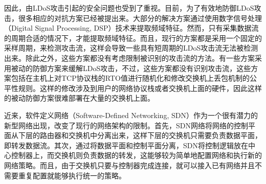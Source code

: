 因此，由LDoS攻击引起的安全问题也受到了重视。目前，为了有效地防御LDoS攻击，很多相应的对抗方案已经被提出来。大部分的解决方案\cite{b1,b4, b6, b7, b22}通过使用数字信号处理（Digital Signal Processing, DSP）技术来提取频域特征。然而，只有采集数据流的周期合适的情况下，才能提取频域特征。而且，现行的方案都是采用一个固定的采样周期，来检测攻击流，这样会导致一些具有短周期的LDoS攻击流无法被检测出来。除此之外，这些方案都没有考虑限制被识别的攻击流的方法。有一些方案采用被动的防御方案来缓解LDoS攻击，不过，这些方案都没有识别攻击流，这些方案包括在主机上对TCP协议栈的RTO值进行随机化\cite{b17}和修改交换机上丢包机制的公平性规则\cite{b8}。这样的修改涉及到用户的网络协议栈或者交换机上面的硬件，因此这样的被动防御方案很难部署在大量的交换机上面。

近来，软件定义网络（Software-Defined Networking, SDN）作为一个很有潜力的新型网络出现，改变了现行的网络架构的限制。首先，SDN网络将网络的控制平面从下层的路由器和交换机中分离出来，这样下层的交换机只需要负责数据平面，即转发数据流。其次，通过将数据平面和控制平面分离，SDN将控制逻辑放在中心控制器上，而交换机则负责数据的转发，这能够较为简单地配置网络和执行新的网络策略。而且，由于交换机只要与控制器完成连接，就可以接入已有网络并且不需要重复配置就能够执行统一的策略。



